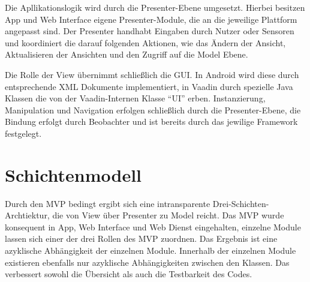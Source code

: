 Die Apllikationslogik wird durch die Presenter-Ebene umgesetzt. Hierbei besitzen App und Web Interface eigene Presenter-Module, die an die jeweilige Plattform angepasst sind. Der Presenter handhabt Eingaben durch Nutzer oder Sensoren und koordiniert die darauf folgenden Aktionen, wie das Ändern der Ansicht, Aktualisieren der Ansichten und den Zugriff auf die Model Ebene.\newline\par 

Die Rolle der View übernimmt schließlich die GUI. In Android wird diese durch entsprechende XML Dokumente implementiert, in Vaadin durch spezielle Java Klassen die von der Vaadin-Internen Klasse ``UI'' erben. Instanzierung, Manipulation und Navigation erfolgen schließlich durch die Presenter-Ebene, die Bindung erfolgt durch Beobachter und ist bereits durch das jewilige Framework festgelegt.

\section{Schichtenmodell}
Durch den MVP bedingt ergibt sich eine intransparente Drei-Schichten-Archtiektur, die von View über Presenter zu Model reicht. Das MVP wurde konsequent in App, Web Interface und Web Dienst eingehalten, einzelne Module lassen sich einer der drei Rollen des MVP zuordnen. Das Ergebnis ist eine azyklische Abhängigkeit der einzelnen Module.\newline
Innerhalb der einzelnen Module existieren ebenfalls nur azyklische Abhängigkeiten zwischen den Klassen. Das verbessert sowohl die Übersicht als auch die Testbarkeit des Codes.

